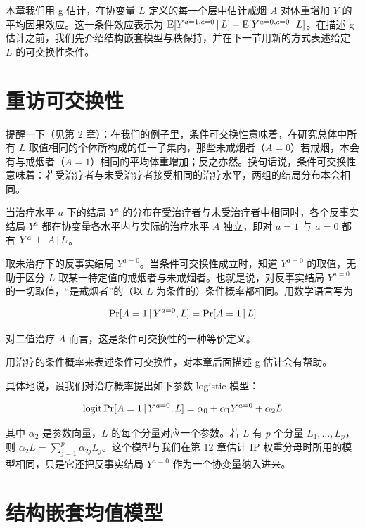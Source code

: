 本章我们用 g 估计，在协变量 $L$ 定义的每一个层中估计戒烟 $A$ 对体重增加 $Y$ 的平均因果效应。这一条件效应表示为 $\mathrm{E}[Y^{a=1,c=0}\,|\, L]-\mathrm{E}[Y^{a=0,c=0}\,|\, L]$。在描述 g 估计之前，我们先介绍结构嵌套模型与秩保持，并在下一节用新的方式表述给定 $L$ 的可交换性条件。

\section{重访可交换性}

提醒一下（见第 2 章）：在我们的例子里，条件可交换性意味着，在研究总体中所有 $L$ 取值相同的个体所构成的任一子集内，那些未戒烟者（$A=0$）若戒烟，本会有与戒烟者（$A=1$）相同的平均体重增加；反之亦然。换句话说，条件可交换性意味着：若受治疗者与未受治疗者接受相同的治疗水平，两组的结局分布本会相同。


当治疗水平 $a$ 下的结局 $Y^a$ 的分布在受治疗者与未受治疗者中相同时，各个反事实结局 $Y^a$ 都在协变量各水平内与实际的治疗水平 $A$ 独立，即对 $a=1$ 与 $a=0$ 都有 $Y^a\perp\!\!\!\perp A\,|\, L$。

取未治疗下的反事实结局 $Y^{a=0}$。当条件可交换性成立时，知道 $Y^{a=0}$ 的取值，无助于区分 $L$ 取某一特定值的戒烟者与未戒烟者。也就是说，对反事实结局 $Y^{a=0}$ 的一切取值，“是戒烟者”的（以 $L$ 为条件的）条件概率都相同。用数学语言写为

\[
\Pr[A=1\,|\, Y^{a=0},L]=\Pr[A=1\,|\, L]
\]

对二值治疗 $A$ 而言，这是条件可交换性的一种等价定义。

用治疗的条件概率来表述条件可交换性，对本章后面描述 g 估计会有帮助。

具体地说，设我们对治疗概率提出如下参数 logistic 模型：

\[
\operatorname{logit}\Pr[A=1\,|\, Y^{a=0},L]=\alpha_0+\alpha_1Y^{a=0}+\alpha_2L
\]


其中 $\alpha_2$ 是参数向量，$L$ 的每个分量对应一个参数。若 $L$ 有 $p$ 个分量 $L_1,\dots,L_p$，则 $\alpha_2L=\sum_{j=1}^{p}\alpha_{2j}L_j$。这个模型与我们在第 12 章估计 IP 权重分母时所用的模型相同，只是它还把反事实结局 $Y^{a=0}$ 作为一个协变量纳入进来。

\section{结构嵌套均值模型}

